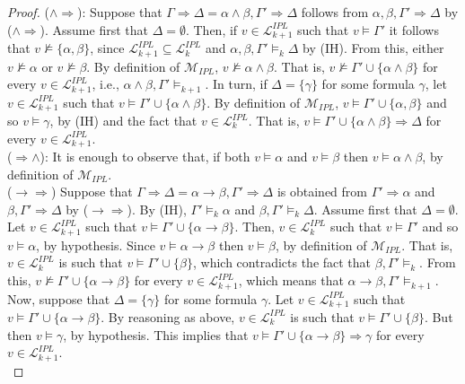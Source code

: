\documentclass[10pt,a4paper]{amsart}
\begin{document}
\begin{proof}
($\wedge\Rightarrow$): Suppose that $\Gamma \Rightarrow\Delta=\alpha \land \beta,\Gamma' \Rightarrow\Delta$ follows from $\alpha, \beta,\Gamma'\Rightarrow\Delta$ by ($\wedge\Rightarrow$). Assume first that $\Delta=\emptyset$. Then, if $v \in \mathcal{L}_{k+1}^{IPL}$ such that $v \models\Gamma'$  it follows that $v \not\models\{\alpha,\beta\}$, since $\mathcal{L}_{k+1}^{IPL} \subseteq \mathcal{L}_k^{IPL}$ and $\alpha, \beta,\Gamma'\models_{k}\Delta$ by (IH). From this, either  $v \not\models\alpha$ or  $v \not\models\beta$. By definition of $\mathcal{M}_{IPL}$,  $v \not\models\alpha \land\beta$. That is, $v \not\models\Gamma' \cup \{\alpha\land\beta\}$ for every $v\in \mathcal{L}_{k+1}^{IPL}$, i.e., $\alpha\wedge\beta, \Gamma'\models_{k+1}$. In turn, if  $\Delta=\{\gamma\}$ for some formula $\gamma$, let $v \in \mathcal{L}_{k+1}^{IPL}$ such that $v \models\Gamma' \cup \{\alpha\land\beta\}$. By definition of $\mathcal{M}_{IPL}$, $v \models\Gamma' \cup \{\alpha,\beta\}$ and so $v\models\gamma$, by (IH) and the fact that  $v \in \mathcal{L}_k^{IPL}$. That is, $v\models \Gamma' \cup \{\alpha \land\beta\}\Rightarrow\Delta$ for every $v\in \mathcal{L}_{k+1}^{IPL}$.\\[1mm]
%
($\Rightarrow\wedge$): It is enough to observe that, if both $v\models \alpha$ and $v\models \beta$ then $v\models \alpha\wedge\beta$, by definition of $\mathcal{M}_{IPL}$.\\[1mm]
%
($\to\Rightarrow$) Suppose that $\Gamma \Rightarrow\Delta= \alpha \to \beta,\Gamma'\Rightarrow \Delta$ is obtained from $\Gamma' \Rightarrow \alpha$ and $\beta, \Gamma' \Rightarrow\Delta$ by ($\to\Rightarrow$). By (IH),  $\Gamma'\models_{k} \alpha$ and $\beta, \Gamma' \models_{k}\Delta$. Assume first that $\Delta=\emptyset$. Let $v \in \mathcal{L}_{k+1}^{IPL}$ such that $v \models\Gamma' \cup\{\alpha \to \beta\}$. Then, $v  \in \mathcal{L}_{k}^{IPL}$ such that $v \models\Gamma'$ and so $v\models \alpha$, by hypothesis. Since $v \models\alpha \to \beta$ then  $v \models \beta$, by definition of  $\mathcal{M}_{IPL}$. That is, $v  \in \mathcal{L}_{k}^{IPL}$ is such that $v \models\Gamma'\cup \{\beta\}$, which contradicts the fact that $\beta, \Gamma' \models_{k}$. From this,  $v \not\models\Gamma' \cup\{\alpha \to \beta\}$ for every $v \in \mathcal{L}_{k+1}^{IPL}$, which means that $\alpha \to\beta,\Gamma'\models_{k+1}$. Now, suppose that $\Delta=\{\gamma\}$ for some formula $\gamma$.  Let $v \in \mathcal{L}_{k+1}^{IPL}$ such that $v \models\Gamma' \cup\{\alpha \to \beta\}$. By reasoning as above,   $v  \in \mathcal{L}_{k}^{IPL}$ is such that $v \models\Gamma'\cup \{\beta\}$. But then $v \models \gamma$, by hypothesis. This implies that $v \models\Gamma' \cup\{\alpha \to \beta\} \Rightarrow \gamma$ for every $v \in \mathcal{L}_{k+1}^{IPL}$. \\[1mm]

\end{proof}
\end{document}

